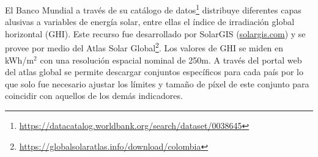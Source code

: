 El Banco Mundial a través de su catálogo de datos\footnote{\url{https://datacatalog.worldbank.org/search/dataset/0038645}} distribuye diferentes capas alusivas 
a variables de energía solar, entre ellas el índice de irradiación global horizontal (GHI).  Este recurso fue desarrollado por SolarGIS 
(\href{https://solargis.com}{solargis.com}) y se provee por medio del Atlas Solar Global\footnote{\url{https://globalsolaratlas.info/download/colombia}}.  Los 
valores de GHI se miden en kWh/m$^2$ con una resolución espacial nominal de 250m.  A través del portal web del atlas global se permite descargar conjuntos 
específicos para cada país por lo que solo fue necesario ajustar los límites y tamaño de píxel de este conjunto para coincidir con aquellos de los demás 
indicadores.
